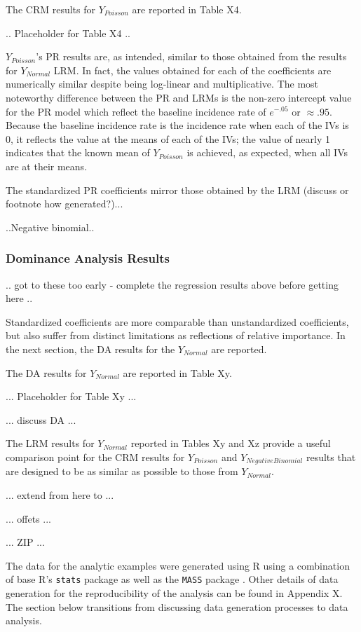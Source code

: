 \documentclass[ShortAfour,times,sageapa]{sagej}
\begin{document}
	The CRM results for $Y_{Poisson}$ are reported in Table X4.
	
	.. Placeholder for Table X4 ..
	
	$Y_{Poisson}$'s PR results are, as intended, similar to those obtained from the results for $Y_{Normal}$ LRM.
	In fact, the values obtained for each of the coefficients are numerically similar despite being log-linear and multiplicative.
	The most noteworthy difference between the PR and LRMs is the non-zero intercept value for the PR model which reflect the baseline incidence rate of $e^{-.05}$ or $\approx .95$. 
	Because the baseline incidence rate is the incidence rate when each of the IVs is 0, it reflects the value at the means of each of the IVs; the value of nearly 1 indicates that the known mean of $Y_{Poisson}$ is achieved, as expected, when all IVs are at their means.
	
	The standardized PR coefficients mirror those obtained by the LRM (discuss or footnote how generated?)...
	
	..Negative binomial..
	
	
		\subsubsection{Dominance Analysis Results}
		
	.. got to these too early - complete the regression results above before getting here ..
	
	
	Standardized coefficients are more comparable than unstandardized coefficients, but also suffer from distinct limitations as reflections of relative importance.
	In the next section, the DA results for the $Y_{Normal}$ are reported.
	
	The DA results for $Y_{Normal}$ are reported in Table Xy.
	
	... Placeholder for Table Xy ...
	
	... discuss DA ...
	
	The LRM results for $Y_{Normal}$ reported in Tables Xy and Xz provide a useful comparison point for the CRM results for $Y_{Poisson}$ and $Y_{NegativeBinomial}$ results that are designed to be as similar as possible to those from $Y_{Normal}$.  
	
	
	
	... extend from here to ...
	
	... offets ...
	
	... ZIP ...
	
	The data for the analytic examples were generated using R \cite{R} using a combination of base R's \texttt{stats} package as well as the \texttt{MASS} package \cite{MASS}.  
	Other details of data generation for the reproducibility of the analysis can be found in Appendix X.  
	The section below transitions from discussing data generation processes to data analysis.
	
\end{document}
